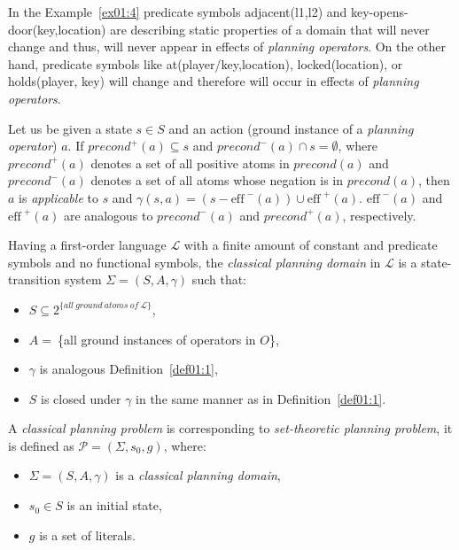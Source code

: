 \medskip\noindent
In the Example~\ref{ex01:4} predicate symbols adjacent(l1,l2) and key-opens-door(key,location) are describing static properties of a domain that will never change and thus, will never appear in effects of \emph{planning operators}. On the other hand, predicate symbols like at(player/key,location), locked(location), or holds(player, key) will change and therefore will occur in effects of \emph{planning operators}.

\begin{defn}\label{def01:6}
Let us be given a state $s \in S$ and an action (ground instance of a \emph{planning operator}) $a$. If $precond^{+}(a) \subseteq s$ and $precond^{-}(a) \cap s = \emptyset$, where $precond^{+}(a)$ denotes a set of all positive atoms in $precond(a)$ and $precond^{-}(a)$ denotes a set of all atoms whose negation is in $precond(a)$, then $a$ is \emph{applicable} to $s$ and $\gamma(s,a)=(s-\text{eff}^{\,\,-}(a)) \cup \text{eff}^{\,\,+}(a)$. $\text{eff}^{\,\,-}(a)$ and $\text{eff}^{\,\,+}(a)$ are analogous to $precond^{-}(a)$ and $precond^{+}(a)$, respectively.
\end{defn}

\begin{defn}\label{def01:7}
Having a first-order language $\mathcal{L}$ with a finite amount of constant and predicate symbols and no functional symbols, the \emph{classical planning domain} in $\mathcal{L}$ is a state-transition system $\Sigma = (S,A,\gamma)$ such that:

    \begin{itemize}
        \item $S \subseteq 2^{\displaystyle \{all~ground~atoms~of~\mathcal{L}\}}$,
        \item $A =~$\{all ground instances of operators in $O$\},
        \item $\gamma$ is analogous Definition~\ref{def01:1},
        \item $S$ is closed under $\gamma$ in the same manner as in Definition~\ref{def01:1}.
    \end{itemize}
\end{defn}

\begin{defn}\label{def01:8}
A \emph{classical planning problem} is corresponding to \emph{set-theoretic planning problem}, it is defined as $\mathcal{P} = (\Sigma,s_0,g)$, where:

    \begin{itemize}
        \item $\Sigma = (S,A,\gamma)$ is a \emph{classical planning domain},
        \item $s_0 \in S$ is an initial state,
        \item $g$ is a set of literals.
    \end{itemize}
\end{defn}

\begin{example}\label{ex01:5}
\end{example}